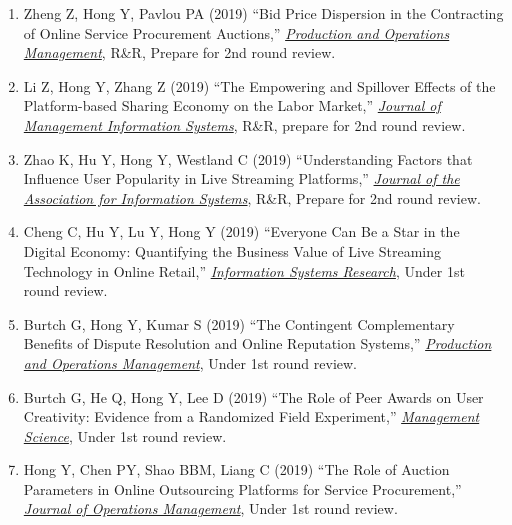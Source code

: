 \documentclass[paper=letter,fontsize=10pt]{scrartcl} %
\newcommand{\ReviewEntry}[5]{
		\noindent #1 (#2) ``#3,'' \textit{\ul{#4}}, #5.}
\newcommand{\Hong}{Hong Y}
\begin{document}
\begin{enumerate}
\item \ReviewEntry{Zheng Z, \Hong, Pavlou PA}{2019}{Bid Price Dispersion in the Contracting of Online Service Procurement Auctions}{\protect\newline Production and Operations Management}{R\&R, Prepare for 2nd round review}{}

\item \ReviewEntry{Li Z, \Hong, Zhang Z}{2019}{The Empowering and Spillover Effects of the Platform-based Sharing Economy on the Labor Market}{\protect\newline Journal of Management Information Systems}{R\&R, prepare for 2nd round review}{}

\item \ReviewEntry{Zhao K, Hu Y, \Hong, Westland C}{2019}{Understanding Factors that Influence User Popularity in Live Streaming Platforms}{\protect\newline Journal of the Association for Information Systems}{R\&R, Prepare for 2nd round review}{}

\item \ReviewEntry{Cheng C, Hu Y, Lu Y, \Hong}{2019}{Everyone Can Be a Star in the Digital Economy: Quantifying the Business Value of Live Streaming Technology in Online Retail}{\protect\newline Information Systems Research}{Under 1st round review}{}

\item \ReviewEntry{Burtch G, \Hong, Kumar S}{2019}{The Contingent Complementary Benefits of Dispute Resolution and Online Reputation Systems}{\protect\newline Production and Operations Management}{Under 1st round review}{}

\item \ReviewEntry{Burtch G, He Q, \Hong, Lee D}{2019}{The Role of Peer Awards on User Creativity: Evidence from a Randomized Field Experiment}{\protect\newline Management Science}{Under 1st round review}{}


\item \ReviewEntry{\Hong, Chen PY, Shao BBM, Liang C}{2019}{The Role of Auction Parameters in Online Outsourcing Platforms for Service Procurement}{\protect\newline Journal of Operations Management}{Under 1st round review}{}


\end{enumerate}
\end{document}
